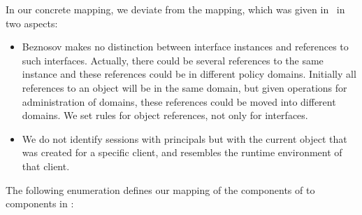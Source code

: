 In our concrete mapping, we deviate from the mapping, which was given
in~\cite{beznosov.ea:framework:1999} in two aspects:
\begin{itemize}
\item Beznosov makes no distinction between interface instances and references
  to such interfaces.  Actually, there could be several references to the same
  instance and these references could be in different policy domains.  Initially
  all references to an object will be in the same domain, but given operations
  for administration of domains, these references could be moved into different
  domains.  We set rules for object references, not only for interfaces.
\item We do not identify sessions with principals but with the current object
  that was created for a specific client, and resembles the runtime environment
  of that client.
\end{itemize}
The following enumeration defines our mapping of the components of \rbaci{} to
components in \corbasec:

